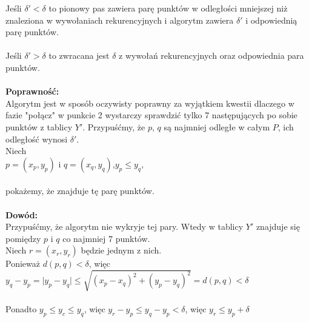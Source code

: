 Jeśli $\delta'<\delta$ to pionowy pas zawiera parę punktów w odległości mniejszej niż znaleziona w  wywołaniach rekurencyjnych i algorytm zawiera $\delta'$ i odpowiednią parę punktów.\\
\\
Jeśli $\delta'>\delta$ to zwracana jest $\delta$ z wywołań rekurencyjnych oraz odpowiednia para punktów.\\
\\
\textbf{Poprawność: }\\
Algorytm jest w sposób oczywisty poprawny za wyjątkiem kwestii dlaczego w fazie "połącz" w punkcie 2 wystarczy sprawdzić tylko 7 następujących po sobie punktów z tablicy $Y'$. Przypuśćmy, że $p$, $q$ są najmniej odległe w całym $P$, ich odległość wynosi $\delta'$.\\
Niech \\
\tab $p=(x_p,y_p)$ i $q=(x_q,y_q)$,\tab \tab $y_p\leq y_q$,\\
\\
pokażemy, że znajduje tę parę punktów.\\
\\
\textbf{Dowód: }\\
Przypuśćmy, że algorytm nie wykryje tej pary. Wtedy w tablicy $Y'$ znajduje się pomiędzy $p$ i $q$ co najmniej 7 punktów.\\
Niech $r=(x_r,y_r)$ będzie jednym z nich.\\
Ponieważ $d(p,q)<\delta$, więc $y_q-y_p = \vert y_p - y_q \vert \leq \sqrt{(x_p-x_q)^2+(y_p-y_q)^2}=d(p,q)<\delta$\\
\\
Ponadto $y_p\leq y_c\leq y_q$, więc $y_r-y_p \leq y_q-y_p<\delta$, więc $y_r\leq y_p + \delta$\\
\\

